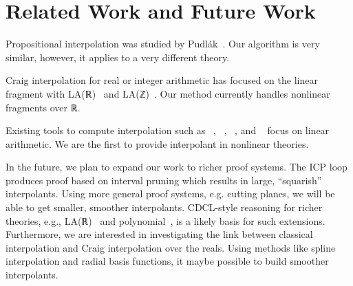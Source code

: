 \section{Related Work and Future Work}
\label{sec:related}

Propositional interpolation was studied by Pudl{\'a}k~\cite{MR1472134}.
Our algorithm is very similar, however, it applies to a very different theory.

Craig interpolation for real or integer arithmetic has focused on the 
linear fragment with LA(ℝ)~\cite{DBLP:conf/tacas/McMillan04,DBLP:conf/vmcai/RybalchenkoS07} and LA(ℤ)~\cite{DBLP:conf/cade/BrilloutKRW10,DBLP:conf/tacas/GriggioLS11}.
Our method currently handles nonlinear fragments over ℝ.

Existing tools to compute interpolation such as
\mathsat~\cite{mathsat5},
\princess~\cite{DBLP:conf/cade/BrilloutKRW10},
\smtinterpol~\cite{DBLP:conf/spin/ChristHN12}, and
\zthree~\cite{DBLP:conf/fmcad/McMillan11}
focus on linear arithmetic.
We are the first to provide interpolant in nonlinear theories.

In the future, we plan to expand our work to richer proof systems.
The ICP loop produces proof based on interval pruning which results in large, ``squarish'' interpolants.
Using more general proof systems, e.g. cutting planes, we will be able to get smaller, smoother interpolants.
CDCL-style reasoning for richer theories, e.g., LA(ℝ)~\cite{DBLP:conf/cav/McMillanKS09} and polynomial~\cite{DBLP:conf/cade/JovanovicM12}, is a likely basis for such extensions.
Furthermore, we are interested in investigating the link between classical interpolation and Craig interpolation over the reals.
Using methods like spline interpolation and radial basis functions, it maybe possible to build smoother interpolants.
